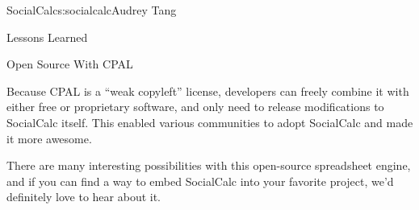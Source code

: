 \begin{aosachapter}{SocialCalc}{s:socialcalc}{Audrey Tang}
\begin{aosasect1}{Lessons Learned}
\begin{aosasect2}{Open Source With CPAL}

Because CPAL is a ``weak copyleft'' license, developers can freely
combine it with either free or proprietary software, and only need to
release modifications to SocialCalc itself.  This enabled various
communities to adopt SocialCalc and made it more awesome.


There are many interesting possibilities with this open-source
spreadsheet engine, and if you can find a way to embed SocialCalc
into your favorite project, we'd definitely love to hear about it.

\end{aosasect2}

\end{aosasect1}

\end{aosachapter}
